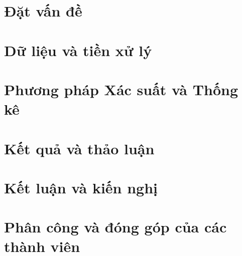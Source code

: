 \documentclass[12pt,a4paper,oneside]{report}
\begin{document}


\tableofcontents
\clearpage
\listoffigures
\clearpage
\listoftables
\clearpage
{}

\chapter{Đặt vấn đề}


\chapter{Dữ liệu và tiền xử lý}



\chapter{Phương pháp Xác suất và Thống kê}







\chapter{Kết quả và thảo luận}








\chapter{Kết luận và kiến nghị}




\appendix
\chapter{Phân công và đóng góp của các thành viên}

\end{document}
